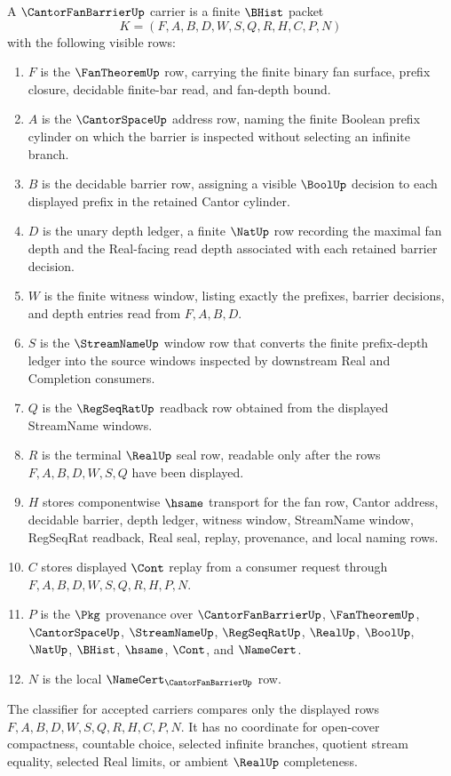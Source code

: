 \begin{definition}
\label{def:cantor-fan-barrier-carrier}
A $\CantorFanBarrierUp$ carrier is a finite $\BHist$ packet
$$
K=(F,A,B,D,W,S,Q,R,H,C,P,N)
$$
with the following visible rows:
\begin{enumerate}
\item $F$ is the $\FanTheoremUp$ row, carrying the finite binary fan surface, prefix closure, decidable finite-bar read, and fan-depth bound.
\item $A$ is the $\CantorSpaceUp$ address row, naming the finite Boolean prefix cylinder on which the barrier is inspected without selecting an infinite branch.
\item $B$ is the decidable barrier row, assigning a visible $\BoolUp$ decision to each displayed prefix in the retained Cantor cylinder.
\item $D$ is the unary depth ledger, a finite $\NatUp$ row recording the maximal fan depth and the Real-facing read depth associated with each retained barrier decision.
\item $W$ is the finite witness window, listing exactly the prefixes, barrier decisions, and depth entries read from $F,A,B,D$.
\item $S$ is the $\StreamNameUp$ window row that converts the finite prefix-depth ledger into the source windows inspected by downstream Real and Completion consumers.
\item $Q$ is the $\RegSeqRatUp$ readback row obtained from the displayed StreamName windows.
\item $R$ is the terminal $\RealUp$ seal row, readable only after the rows $F,A,B,D,W,S,Q$ have been displayed.
\item $H$ stores componentwise $\hsame$ transport for the fan row, Cantor address, decidable barrier, depth ledger, witness window, StreamName window, RegSeqRat readback, Real seal, replay, provenance, and local naming rows.
\item $C$ stores displayed $\Cont$ replay from a consumer request through $F,A,B,D,W,S,Q,R,H,P,N$.
\item $P$ is the $\Pkg$ provenance over $\CantorFanBarrierUp$, $\FanTheoremUp$, $\CantorSpaceUp$, $\StreamNameUp$, $\RegSeqRatUp$, $\RealUp$, $\BoolUp$, $\NatUp$, $\BHist$, $\hsame$, $\Cont$, and $\NameCert$.
\item $N$ is the local $\NameCert_{\CantorFanBarrierUp}$ row.
\end{enumerate}
The classifier for accepted carriers compares only the displayed rows $F,A,B,D,W,S,Q,R,H,C,P,N$. It has no coordinate for open-cover compactness, countable choice, selected infinite branches, quotient stream equality, selected Real limits, or ambient $\RealUp$ completeness.
\end{definition}

